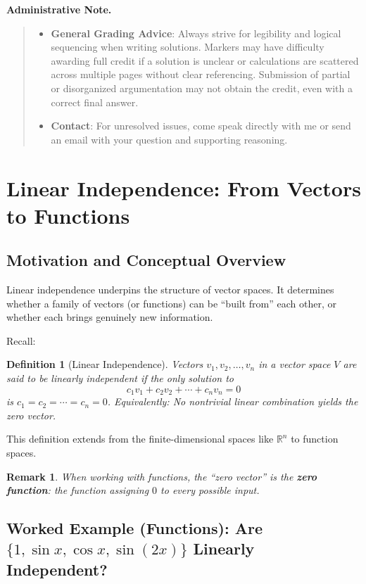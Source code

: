 \documentclass[12pt]{article}
\newtheorem{definition}[theorem]{Definition}
\newtheorem{remark}[theorem]{Remark}
\newenvironment{announcement}
  {\medskip\noindent\textbf{Administrative Note.}\begin{quote}\small}
  {\end{quote}\medskip}
\begin{document}
\begin{announcement}
\begin{itemize}
    \item \textbf{General Grading Advice}: Always strive for legibility and logical sequencing when writing solutions. Markers may have difficulty awarding full credit if a solution is unclear or calculations are scattered across multiple pages without clear referencing. Submission of partial or disorganized argumentation may not obtain the credit, even with a correct final answer.
    \item \textbf{Contact}: For unresolved issues, come speak directly with me or send an email with your question and supporting reasoning.
\end{itemize}
\end{announcement}

\section{Linear Independence: From Vectors to Functions}

\subsection{Motivation and Conceptual Overview}
Linear independence underpins the structure of vector spaces. It determines whether a family of vectors (or functions) can be ``built from'' each other, or whether each brings genuinely new information. 

Recall:
\begin{definition}[Linear Independence]
Vectors $v_1, v_2, \ldots, v_n$ in a vector space $V$ are said to be \emph{linearly independent} if the only solution to
\[
c_1 v_1 + c_2 v_2 + \cdots + c_n v_n = 0
\]
is $c_1 = c_2 = \cdots = c_n = 0$.
Equivalently: No nontrivial linear combination yields the zero vector.
\end{definition}
This definition extends from the finite-dimensional spaces like $\mathbb{R}^n$ to function spaces.

\vspace{0.5em}
\begin{remark}
When working with functions, the ``zero vector'' is the \textbf{zero function}: the function assigning $0$ to every possible input.
\end{remark}

\subsection{Worked Example (Functions): Are \texorpdfstring{$\{1, \sin x, \cos x, \sin(2x)\}$}{1, sin x, cos x, sin 2x} Linearly Independent?}
\end{document}
